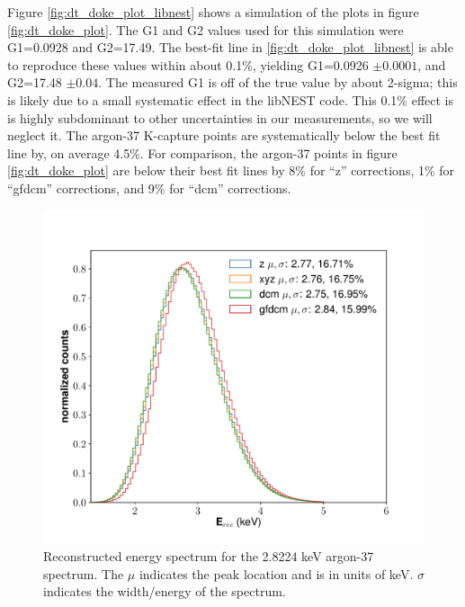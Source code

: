 Figure \ref{fig:dt_doke_plot_libnest} shows a simulation of the plots in figure \ref{fig:dt_doke_plot}. The G1 and G2 values used for this simulation were G1=0.0928 and G2=17.49. The best-fit line in \ref{fig:dt_doke_plot_libnest} is able to reproduce these values within about 0.1\%, yielding G1=0.0926 $\pm0.0001$, and G2=17.48 $\pm0.04$. The measured G1 is off of the true value by about 2-sigma; this is likely due to a small systematic effect in the libNEST code. This 0.1\% effect is is highly subdominant to other uncertainties in our measurements, so we will neglect it. The argon-37 K-capture points are systematically below the best fit line by, on average 4.5\%. For comparison, the argon-37 points in figure \ref{fig:dt_doke_plot} are below their best fit lines by 8\% for ``z'' corrections, 1\% for ``gfdcm'' corrections, and 9\% for ``dcm'' corrections. 
\begin{figure}[h!]
\centering
  \includegraphics[width=\textwidth]{Figures/E_spec_Ar.pdf}
  \caption{Reconstructed energy spectrum for the 2.8224 keV argon-37 spectrum. The $\mu$ indicates the peak location and is in units of keV. $\sigma$ indicates the width/energy of the spectrum.}
\label{fig:E_spec_Ar} 
\end{figure}

